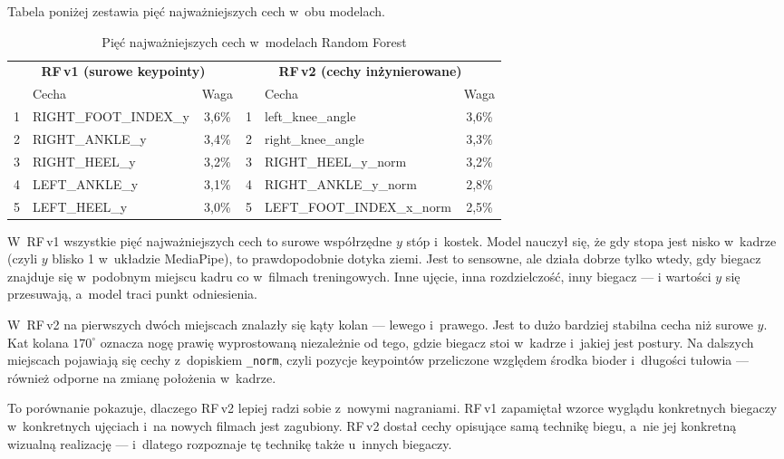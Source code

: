 Tabela poniżej zestawia pięć najważniejszych cech w~obu modelach.

\begin{table}[htbp]
\centering
\caption{Pięć najważniejszych cech w~modelach Random Forest}
\label{tab:feature-importance}
\small
\begin{tabular}{clcclc}
\hline
\multicolumn{3}{c}{\textbf{RF\,v1 (surowe keypointy)}} & \multicolumn{3}{c}{\textbf{RF\,v2 (cechy inżynierowane)}} \\
\ & Cecha & Waga & \ & Cecha & Waga \\
\hline
1 & RIGHT\_FOOT\_INDEX\_y & 3{,}6\% & 1 & left\_knee\_angle      & 3{,}6\% \\
2 & RIGHT\_ANKLE\_y       & 3{,}4\% & 2 & right\_knee\_angle     & 3{,}3\% \\
3 & RIGHT\_HEEL\_y        & 3{,}2\% & 3 & RIGHT\_HEEL\_y\_norm   & 3{,}2\% \\
4 & LEFT\_ANKLE\_y        & 3{,}1\% & 4 & RIGHT\_ANKLE\_y\_norm  & 2{,}8\% \\
5 & LEFT\_HEEL\_y         & 3{,}0\% & 5 & LEFT\_FOOT\_INDEX\_x\_norm & 2{,}5\% \\
\hline
\end{tabular}
\end{table}

W~RF\,v1 wszystkie pięć najważniejszych cech to surowe współrzędne $y$ stóp i~kostek. Model nauczył się, że gdy stopa jest nisko w~kadrze (czyli $y$ blisko 1 w~układzie MediaPipe), to prawdopodobnie dotyka ziemi. Jest to sensowne, ale działa dobrze tylko wtedy, gdy biegacz znajduje się w~podobnym miejscu kadru co w~filmach treningowych. Inne ujęcie, inna rozdzielczość, inny biegacz --- i wartości $y$ się przesuwają, a~model traci punkt odniesienia.

W~RF\,v2 na pierwszych dwóch miejscach znalazły się kąty kolan --- lewego i~prawego. Jest to dużo bardziej stabilna cecha niż surowe $y$. Kat kolana $170^\circ$ oznacza nogę prawię wyprostowaną niezależnie od tego, gdzie biegacz stoi w~kadrze i~jakiej jest postury. Na dalszych miejscach pojawiają się cechy z~dopiskiem \texttt{\_norm}, czyli pozycje keypointów przeliczone względem środka bioder i~długości tułowia --- również odporne na zmianę położenia w~kadrze.

To porównanie pokazuje, dlaczego RF\,v2 lepiej radzi sobie z~nowymi nagraniami. RF\,v1 zapamiętał wzorce wyglądu konkretnych biegaczy w~konkretnych ujęciach i~na nowych filmach jest zagubiony. RF\,v2 dostał cechy opisujące samą technikę biegu, a~nie jej konkretną wizualną realizację --- i~dlatego rozpoznaje tę technikę także u~innych biegaczy.



